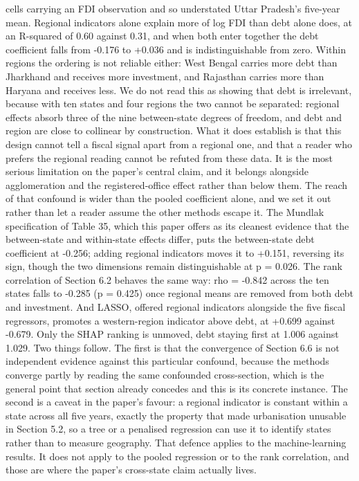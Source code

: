 \documentclass[12pt,a4paper]{article}
\begin{document}
cells carrying an FDI observation and so understated Uttar Pradesh's five-year mean. Regional indicators alone explain more of log FDI than debt alone does, at an R-squared of 0.60 against 0.31, and when both enter together the debt coefficient falls from -0.176 to +0.036 and is indistinguishable from zero. Within regions the ordering is not reliable either: West Bengal carries more debt than Jharkhand and receives more investment, and Rajasthan carries more than Haryana and receives less. We do not read this as showing that debt is irrelevant, because with ten states and four regions the two cannot be separated: regional effects absorb three of the nine between-state degrees of freedom, and debt and region are close to collinear by construction. What it does establish is that this design cannot tell a fiscal signal apart from a regional one, and that a reader who prefers the regional reading cannot be refuted from these data. It is the most serious limitation on the paper's central claim, and it belongs alongside agglomeration and the registered-office effect rather than below them. The reach of that confound is wider than the pooled coefficient alone, and we set it out rather than let a reader assume the other methods escape it. The Mundlak specification of Table 35, which this paper offers as its cleanest evidence that the between-state and within-state effects differ, puts the between-state debt coefficient at -0.256; adding regional indicators moves it to +0.151, reversing its sign, though the two dimensions remain distinguishable at p = 0.026. The rank correlation of Section 6.2 behaves the same way: rho = -0.842 across the ten states falls to -0.285 (p = 0.425) once regional means are removed from both debt and investment. And LASSO, offered regional indicators alongside the five fiscal regressors, promotes a western-region indicator above debt, at +0.699 against -0.679. Only the SHAP ranking is unmoved, debt staying first at 1.006 against 1.029. Two things follow. The first is that the convergence of Section 6.6 is not independent evidence against this particular confound, because the methods converge partly by reading the same confounded cross-section, which is the general point that section already concedes and this is its concrete instance. The second is a caveat in the paper's favour: a regional indicator is constant within a state across all five years, exactly the property that made urbanisation unusable in Section 5.2, so a tree or a penalised regression can use it to identify states rather than to measure geography. That defence applies to the machine-learning results. It does not apply to the pooled regression or to the rank correlation, and those are where the paper's cross-state claim actually lives.
\end{document}
